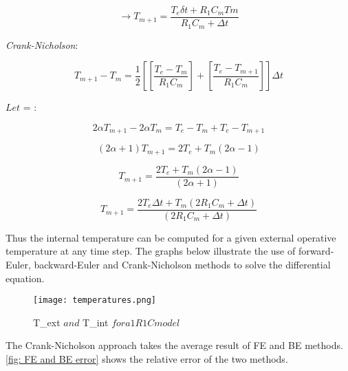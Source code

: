 \begin{equation} \label{eq:7}
\rightarrow T_{m+1} = \frac{T_e \delta{t} + R_1 C_m Tm}{R_1 C_m + \Delta{t}} 
\end{equation}


\textit{Crank-Nicholson}:

\begin{equation*}
T_{m+1} - T_m = \frac{1}{2} \left[ \left[ \frac{T_e-T_m}{R_1 C_m}\right] + \left[ \frac{T_e-T_{m+1}} {R_1 C_m}\right] \right] \Delta{t}
\end{equation*}

$Let$ \alpha =  : 


\begin{equation*}
2 \alpha T_{m+1} - 2 \alpha T_m = T_e - T_m + T_e - T_{m+1}
\end{equation*}

\begin{equation*}
(2 \alpha + 1) T_{m+1} = 2 T_e + T_m (2 \alpha - 1) 
\end{equation*}

\begin{equation*}
T_{m+1} = \frac{2 T_e + T_m (2 \alpha - 1)}{(2 \alpha + 1)} 
\end{equation*}


\begin{equation} \label{eq:8}
T_{m+1} = \frac{2 T_e \Delta{t} + T_m (2 R_1 C_m + \Delta{t})}{(2 R_1 C_m + \Delta{t})} 
\end{equation}

Thus the internal temperature can be computed for a given external operative temperature at any time step. The graphs below illustrate the use of forward-Euler, backward-Euler and Crank-Nicholson methods to solve the differential equation.\par



\begin{figure}[ht] %
  \begin{center}
    \texttt{[image: temperatures.png]}
    \caption{T_{ext} $ and $ T_{int} $ for a 1R1C model$}
    \label{fig: 1R1C model}
  \end{center} 
\end{figure}




\newpage
The Crank-Nicholson approach takes the average result of FE and BE methods. \ref{fig: FE and BE error} shows the relative error of the two methods.

